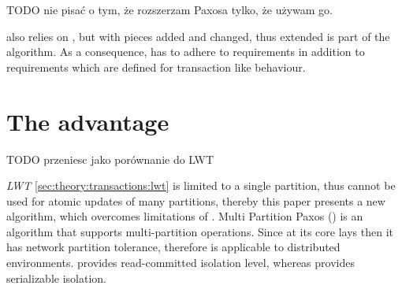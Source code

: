
TODO nie pisać o tym, że rozszerzam Paxosa tylko, że używam go.

\mpp also relies on \paxos, but with pieces added and changed, thus extended
\paxos is part of the \mpp algorithm. As a consequence, \mpp has to adhere to \paxos requirements in addition to requirements which are defined for transaction like behaviour. 

\section{The advantage}
TODO przeniesc jako porównanie do LWT

\emph{LWT} \ref{sec:theory:transactions:lwt} is limited to a single partition, thus \lwt cannot be used for atomic updates of many partitions, thereby this paper presents a new algorithm, which overcomes limitations of \lwt.
Multi Partition Paxos (\mpp) is an algorithm that supports multi-partition operations. Since at its core lays \paxos then it has network partition tolerance, therefore is applicable to distributed environments. \mpp provides read-committed isolation level, whereas \lwt provides serializable isolation.